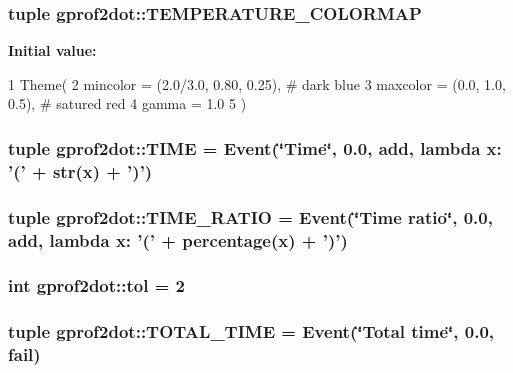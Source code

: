 \label{namespacegprof2dot_a58b6460141073b790688ed1dd4d427ee}
\hypertarget{namespacegprof2dot_a4e72c47d6d17a030a03d562812c1a32a}{
\subsubsection[{TEMPERATURE\_\-COLORMAP}]{\setlength{\rightskip}{0pt plus 5cm}tuple {\bf gprof2dot::TEMPERATURE\_\-COLORMAP}}}
\label{namespacegprof2dot_a4e72c47d6d17a030a03d562812c1a32a}
{\bfseries Initial value:}
\begin{DoxyCode}
1 Theme(
2     mincolor = (2.0/3.0, 0.80, 0.25), # dark blue
3     maxcolor = (0.0, 1.0, 0.5), # satured red
4     gamma = 1.0
5 )
\end{DoxyCode}
\hypertarget{namespacegprof2dot_a6d330baab773f0f34c75fa91c763cbd3}{
\subsubsection[{TIME}]{\setlength{\rightskip}{0pt plus 5cm}tuple {\bf gprof2dot::TIME} = {\bf Event}(\char`\"{}Time\char`\"{}, 0.0, add, lambda x: '(' + str(x) + ')')}}
\label{namespacegprof2dot_a6d330baab773f0f34c75fa91c763cbd3}
\hypertarget{namespacegprof2dot_ac93e094e954c5b58088dc398a764670b}{
\subsubsection[{TIME\_\-RATIO}]{\setlength{\rightskip}{0pt plus 5cm}tuple {\bf gprof2dot::TIME\_\-RATIO} = {\bf Event}(\char`\"{}Time ratio\char`\"{}, 0.0, add, lambda x: '(' + percentage(x) + ')')}}
\label{namespacegprof2dot_ac93e094e954c5b58088dc398a764670b}
\hypertarget{namespacegprof2dot_a442824fd8acb25239ae698ca2c7e08d6}{
\subsubsection[{tol}]{\setlength{\rightskip}{0pt plus 5cm}int {\bf gprof2dot::tol} = 2}}
\label{namespacegprof2dot_a442824fd8acb25239ae698ca2c7e08d6}
\hypertarget{namespacegprof2dot_a3b63ba497b1ebe0c63064d7c77123930}{
\subsubsection[{TOTAL\_\-TIME}]{\setlength{\rightskip}{0pt plus 5cm}tuple {\bf gprof2dot::TOTAL\_\-TIME} = {\bf Event}(\char`\"{}Total time\char`\"{}, 0.0, fail)}}
